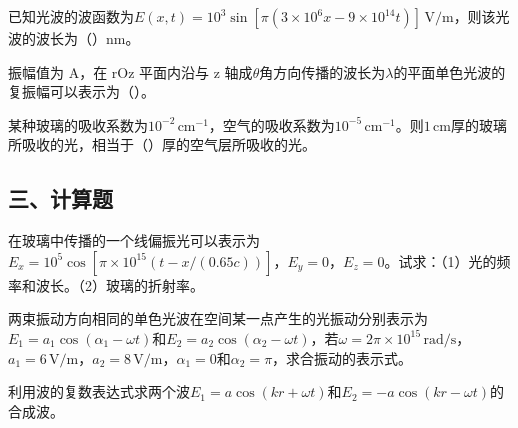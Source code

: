 \documentclass[padl, analysis, notocnum]{ExBook}
\newcommand{\answerarea}[1][3.5cm]{%
  \par\vspace{1mm}%
  \noindent{\color{themeColor!35}\rule{\linewidth}{0.4pt}}\par
  \noindent\begin{minipage}[t][#1][t]{\linewidth}\vspace{0pt}\end{minipage}\par
  \noindent{\color{themeColor!35}\rule{\linewidth}{0.4pt}}\par
}
\begin{document}
\begin{qitems}[startnum=7]
\qitem 已知光波的波函数为$E(x,t)=10^{3}\sin [\pi (3\times 10^{6}x-9\times 10^{14}t)]\,\mathrm{V/m}$，则该光波的波长为（\hspace{1.6em}）nm。
\label{q:191:start}
\answerarea[4.0cm]
\label{q:191:end}
\end{qitems}

\begin{qitems}[startnum=8]
\qitem 振幅值为 A，在 rOz 平面内沿与 z 轴成$\theta$角方向传播的波长为$\lambda$的平面单色光波的复振幅可以表示为（\hspace{1.6em}）。
\label{q:192:start}
\answerarea[4.0cm]
\label{q:192:end}
\end{qitems}

\begin{qitems}[startnum=9]
\qitem 某种玻璃的吸收系数为$10^{-2}\,\mathrm{cm}^{-1}$，空气的吸收系数为$10^{-5}\,\mathrm{cm}^{-1}$。则$1\,\mathrm{cm}$厚的玻璃所吸收的光，相当于（\hspace{1.6em}）厚的空气层所吸收的光。
\label{q:193:start}
\answerarea[4.0cm]
\label{q:193:end}
\end{qitems}

\subsection{三、计算题}
\begin{qitems}[startnum=1]
\qitem 在玻璃中传播的一个线偏振光可以表示为$E_{x}=10^{5}\cos [\pi \times 10^{15}(t-x/(0.65c))]$，$E_{y}=0$，$E_{z}=0$。试求：（1）光的频率和波长。（2）玻璃的折射率。
\label{q:194:start}
\answerarea[7.0cm]
\label{q:194:end}
\end{qitems}

\begin{qitems}[startnum=2]
\qitem 两束振动方向相同的单色光波在空间某一点产生的光振动分别表示为$E_{1}=a_{1}\cos (\alpha_{1}-\omega t)$和$E_{2}=a_{2}\cos (\alpha_{2}-\omega t)$，若$\omega =2\pi \times 10^{15}\,\mathrm{rad/s}$，$a_{1}=6\,\mathrm{V/m}$，$a_{2}=8\,\mathrm{V/m}$，$\alpha_{1}=0$和$\alpha_{2}=\pi$，求合振动的表示式。
\label{q:195:start}
\answerarea[7.0cm]
\label{q:195:end}
\end{qitems}

\begin{qitems}[startnum=3]
\qitem 利用波的复数表达式求两个波$E_{1}=a\cos (kr+\omega t)$和$E_{2}=-a\cos (kr-\omega t)$的合成波。
\label{q:196:start}
\answerarea[7.0cm]
\label{q:196:end}
\end{qitems}
\end{document}
